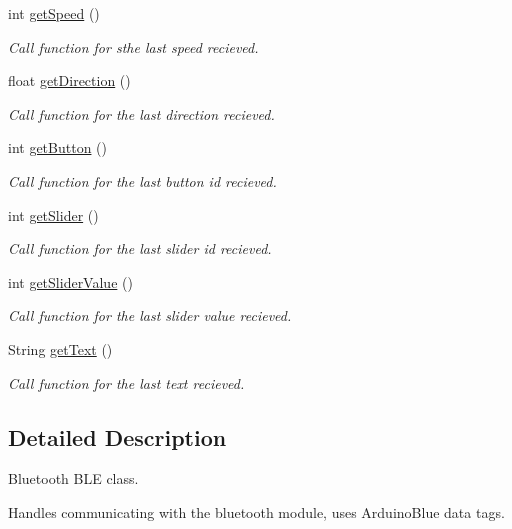 \begin{DoxyCompactItemize}
int \mbox{\hyperlink{classbluetooth_a3c726cf32623b74120736330144e69c8}{get\+Speed}} ()
\begin{DoxyCompactList}\small\item\em Call function for sthe last speed recieved. \end{DoxyCompactList}\item 
float \mbox{\hyperlink{classbluetooth_a49f74afe2c11e5e8a5d3e16e3c8298f5}{get\+Direction}} ()
\begin{DoxyCompactList}\small\item\em Call function for the last direction recieved. \end{DoxyCompactList}\item 
int \mbox{\hyperlink{classbluetooth_aab4c6c9df7046908dc8ae27631241b04}{get\+Button}} ()
\begin{DoxyCompactList}\small\item\em Call function for the last button id recieved. \end{DoxyCompactList}\item 
int \mbox{\hyperlink{classbluetooth_af74bf7e384aa7fee418ef4e644d53794}{get\+Slider}} ()
\begin{DoxyCompactList}\small\item\em Call function for the last slider id recieved. \end{DoxyCompactList}\item 
int \mbox{\hyperlink{classbluetooth_aa888eeb5fd739339e93aa55d9a081a58}{get\+Slider\+Value}} ()
\begin{DoxyCompactList}\small\item\em Call function for the last slider value recieved. \end{DoxyCompactList}\item 
String \mbox{\hyperlink{classbluetooth_a2ce571164eec6be3eb3bc7289c61f3dd}{get\+Text}} ()
\begin{DoxyCompactList}\small\item\em Call function for the last text recieved. \end{DoxyCompactList}\end{DoxyCompactItemize}


\subsection{Detailed Description}
Bluetooth B\+LE class. 

Handles communicating with the bluetooth module, uses Arduino\+Blue data tags. 

